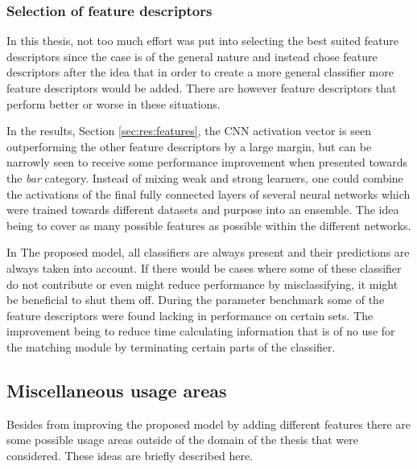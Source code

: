 \subsubsection{Selection of feature descriptors}
\label{sec:conc:future:model:feat}
In this thesis, not too much effort was put into selecting the best suited feature descriptors since the case is of the general nature and instead chose feature descriptors after the idea that in order to create a more general classifier more feature descriptors would be added. There are however feature descriptors that perform better or worse in these situations.

In the results, Section \ref{sec:res:features}, the CNN activation vector is seen outperforming the other feature descriptors by a large margin, but can be narrowly seen to receive some performance improvement when presented towards the \emph{bar} category. Instead of mixing weak and strong learners, one could combine the activations of the final fully connected layers of several neural networks which were trained towards different datasets and purpose into an ensemble. The idea being to cover as many possible features as possible within the different networks. 

In The proposed model, all classifiers are always present and their predictions are always taken into account. If there would be cases where some of these classifier do not contribute or even might reduce performance by misclassifying, it might be beneficial to shut them off. During the parameter benchmark some of the feature descriptors were found lacking in performance on certain sets. The improvement being to reduce time calculating information that is of no use for the matching module by terminating certain parts of the classifier.

\subsection{Miscellaneous usage areas}
\label{sec:conc:future:misc}
Besides from improving the proposed model by adding different features there are some possible usage areas outside of the domain of the thesis that were considered. These ideas are briefly described here.
